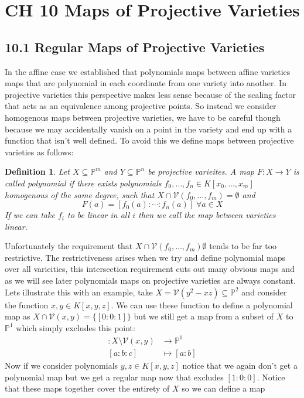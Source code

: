 \documentclass[40pt]{article}
\newtheorem{definition}{Definition}[section]
\newcommand{\Proj}{\mathbb{P}}
\newcommand{\V}{\mathcal{V}}
\theoremstyle{remark}
\begin{document}
		\section{CH 10 Maps of Projective Varieties}
		\subsection{10.1 Regular Maps of Projective Varieties}
		In the affine case we established that polynomials maps between affine varieties maps that are polynomial in each coordinate from one variety into another. In projective varieties this perspective makes less sense because of the scaling factor that acts as an equivalence among projective points. So instead we consider homogenous maps between projective varieties, we have to be careful though because we may accidentally vanish on a point in the variety and end up with a function that isn't well defined. To avoid this we define maps between projective varieties as follows:
		\begin{definition}
			Let $X \subseteq \Proj^m$ and $Y \subseteq \Proj^n$ be projective varieites. A map $F : X \rightarrow Y$ is called polynomial if there exists polynomials $f_0,\dots,f_n \in K[x_0,\dots,x_m]$ homogenous of the same degree, such that $X \cap \V(f_0,\dots,f_m) = \emptyset$ and 
			\[
			F(a) = [f_0(a): \cdots : f_n(a)] \; \forall a \in X
			\]
			If we can take $f_i$ to be linear in all $i$ then we call the map between varieties linear. 
		\end{definition}
		Unfortunately the requirement that $X \cap \V(f_0,\dots,f_m) \emptyset$ tends to be far too restrictive. The restrictiveness arises when we try and define polynomial maps over all varieities, this intersection requirement cuts out many obvious maps and as we will see later polynomials maps on projective varieties are always constant. Lets illustrate this with an example, take $X = \V(y^2 - xz) \subseteq \Proj^2$ and consider the function $x , y \in K[x,y,z]$. We can use these function to define a polynomial map as $X \cap \V(x,y) = \{[0:0:1]\}$ but we still get a map from a subset of $X$ to $\Proj^1$ which simply excludes this point:
		\begin{align}
			[x:y] : X \setminus \V(x,y ) &\rightarrow \Proj^1 \\
			[a:b:c] &\mapsto [a: b]
		\end{align}
		Now if we consider polynomials $y, z \in K[x,y,z]$ notice that we again don't get a polynomial map but we get a regular map now that excludes $[1:0:0]$. Notice that these maps together cover the entirety of $X$ so we can define a map 
\end{document}
